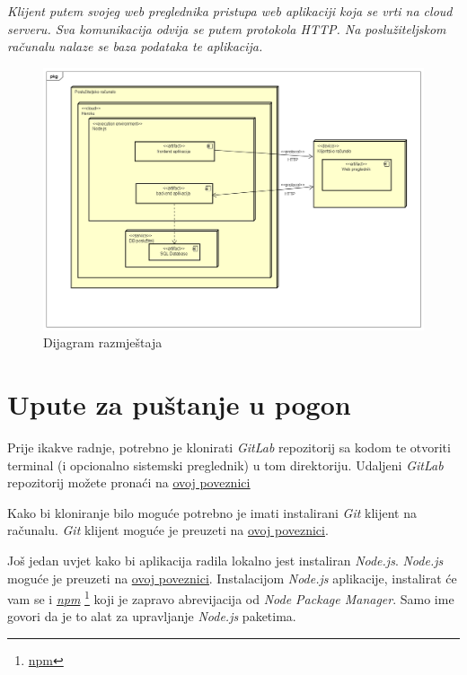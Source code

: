 			 \textit{Klijent putem svojeg web preglednika pristupa web aplikaciji koja se vrti na cloud serveru. Sva komunikacija odvija se putem protokola HTTP. Na poslužiteljskom računalu nalaze se baza podataka te aplikacija.}
			 \begin{figure}[H]
    			\includegraphics[width=1\linewidth]{dijagrami/Deployment Diagram.png}
    			\caption{Dijagram razmještaja}
    			\label{fig:Dijagram razmještaja} 
    		\end{figure}
			\eject 
		
		\section{Upute za puštanje u pogon}
		
		    Prije ikakve radnje, potrebno je klonirati \textit{GitLab} repozitorij sa kodom te otvoriti terminal (i opcionalno sistemski preglednik) u tom direktoriju. Udaljeni \textit{GitLab} repozitorij možete pronaći na  \underline{\href{https://gitlab.com/Cubi5/seven}{ovoj poveznici}}
		    
		    Kako bi kloniranje bilo moguće potrebno je imati instalirani \textit{Git} klijent na računalu. \textit{Git} klijent moguće je preuzeti na \underline{\href{https://git-scm.com/downloads}{ovoj poveznici}}.
		    
		    Još jedan uvjet kako bi aplikacija radila lokalno jest instaliran \textit{Node.js}. \textit{Node.js} moguće je preuzeti na \underline{\href{https://nodejs.org/en/download/}{ovoj poveznici}}. Instalacijom \textit{Node.js} aplikacije, instalirat će vam se i \textit{\underline{npm}} \footnote{\href{https://www.npmjs.com/}{npm}} koji je zapravo abrevijacija od \textit{Node Package Manager}. Samo ime govori da je to alat za upravljanje \textit{Node.js} paketima.

